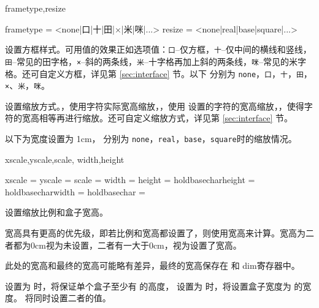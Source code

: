 \documentclass{ctxdoc}
\begin{document}
\begin{function}{frametype,resize}
  \begin{syntax}
    frametype = <none|口|十|田|×|米|咪|...> 
    resize    = <none|real|base|square|...> 
  \end{syntax}
   设置方框样式。可用值的效果正如选项值：\verb|口|--仅方框，\verb|十|--仅中间的横线和竖线，\verb|田|--常见的田字格，\verb|×|--斜的两条线，\verb|米|--十字格再加上斜的两条线，\verb|咪|--常见的米字格。还可自定义方框，详见第 \ref{sec:interface} 节。以下  分别为 \verb|none|，\verb|口|，\verb|十|，\verb|田|，\verb|×|、\verb|米|，\verb|咪|。

  {
  }

   设置缩放方式。，使用字符实际宽高缩放，，使用  设置的字符的宽高缩放，，使得字符的宽高相等再进行缩放。还可自定义缩放方式，详见第 \ref{sec:interface} 节。

  以下为宽度设置为 1cm， 分别为 \verb|none|，\verb|real|，\verb|base|，\verb|square|时的缩放情况。

  {
  }
\end{function}

\begin{function}{
  xscale,yscale,scale,
  width,height
}
  \begin{syntax}
    xscale =  
    yscale =  
    scale  = 
    width  = 
    height = 
    holdbasecharheight = \TTF {}
    holdbasecharwidth  = \TTF {}
    holdbasechar       = \TTF
  \end{syntax}
  设置缩放比例和盒子宽高。

  宽高具有更高的优先级，即若比例和宽高都设置了，则使用宽高来计算。宽高为二者都为0cm视为未设置，二者有一大于0cm，视为设置了宽高。

  此处的宽高和最终的宽高可能略有差异，最终的宽高保存在  和  dim寄存器中。
  
  设置为  时，将保证单个盒子至少有  的高度， 设置为  时，将设置盒子宽度为  的宽度。 将同时设置二者的值。
\end{function}
\end{document}
